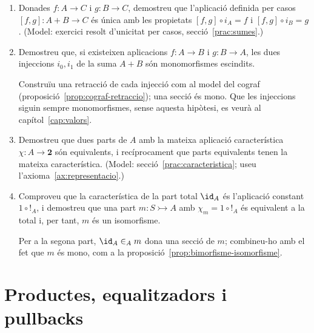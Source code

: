 \begin{enumerate}[resume]
  \item Donades \(f:A\to C\) i \(g:B\to C\), demostreu que l'aplicació definida per casos \([f,g]:A+B\to C\) és única amb les propietats \([f,g]\circ i_A=f\) i \([f,g]\circ i_B=g\). (Model: exercici resolt d'unicitat per casos, secció~\ref{prac:sumes}.)

  \item Demostreu que, si existeixen aplicacions \(f\colon A\to B\) i \(g\colon B\to A\), les dues injeccions \(i_0,i_1\) de la suma \(A+B\) són monomorfismes escindits. \begin{indicacio}Construïu una retracció de cada injecció com al model del cograf (proposició~\ref{prop:cograf-retraccio}); una secció és mono. Que les injeccions siguin sempre monomorfismes, sense aquesta hipòtesi, es veurà al capítol~\ref{cap:valors}.\end{indicacio}

  \item Demostreu que dues parts de \(A\) amb la mateixa aplicació característica \(\chi:A\to\mathbf2\) són equivalents, i recíprocament que parts equivalents tenen la mateixa característica. (Model: secció~\ref{prac:caracteristica}; useu l'axioma~\ref{ax:representacio}.)

  \item Comproveu que la característica de la part total \(\id_A\) és l'aplicació constant \(1\circ{!}_A\), i demostreu que una part \(m\colon S\rightarrowtail A\) amb \(\chi_m=1\circ{!}_A\) és equivalent a la total i, per tant, \(m\) és un isomorfisme. \begin{indicacio}Per a la segona part, \(\id_A\in_A m\) dona una secció de \(m\); combineu-ho amb el fet que \(m\) és mono, com a la proposició~\ref{prop:bimorfisme-isomorfisme}.\end{indicacio}
\end{enumerate}

\section{Productes, equalitzadors i pullbacks}

